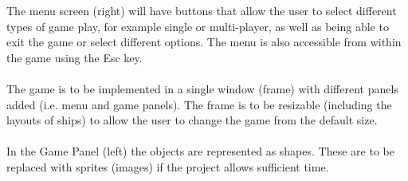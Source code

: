 The menu screen (right) will have buttons that allow the user to select different types of game play, for example single or multi-player, as well as being able to exit the game or select different options. The menu is also accessible from within the game using the Esc key.\\\\
The game is to be implemented in a single window (frame) with different panels added (i.e. menu and game panels). The frame is to be resizable (including the layouts of ships) to allow the user to change the game from the default size.\\\\
In the Game Panel (left) the objects are represented as shapes. These are to be replaced with sprites (images) if the project allows sufficient time.
